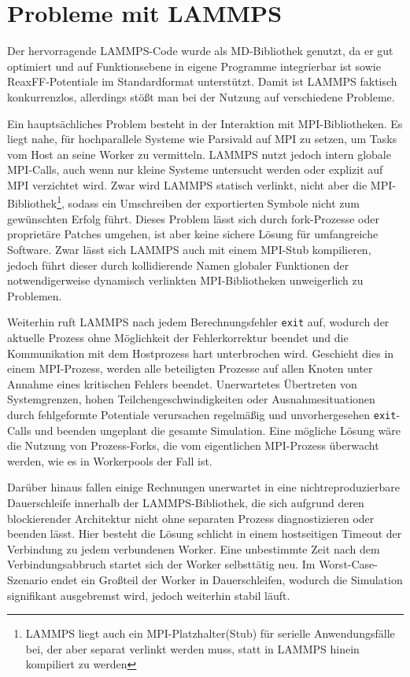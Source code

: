 \section{Probleme mit LAMMPS}
\label{lammpssucks}

Der hervorragende LAMMPS-Code wurde als MD-Bibliothek genutzt, da er gut optimiert und auf Funktionsebene in eigene Programme integrierbar ist sowie ReaxFF-Potentiale im Standardformat unterstützt.
Damit ist LAMMPS faktisch konkurrenzlos, allerdings stößt man bei der Nutzung auf verschiedene Probleme.

Ein hauptsächliches Problem besteht in der Interaktion mit MPI-Bibliotheken.
Es liegt nahe, für hochparallele Systeme wie Parsivald auf MPI zu setzen, um Tasks vom Host an seine Worker zu vermitteln.
LAMMPS nutzt jedoch intern globale MPI-Calls, auch wenn nur kleine Systeme untersucht werden oder explizit auf MPI verzichtet wird.
Zwar wird LAMMPS statisch verlinkt, nicht aber die MPI-Bibliothek\footnote{LAMMPS liegt auch ein MPI-Platzhalter(Stub) für serielle Anwendungsfälle bei, der aber separat verlinkt werden muss, statt in LAMMPS hinein kompiliert zu werden}, sodass ein Umschreiben der exportierten Symbole nicht zum gewünschten Erfolg führt.
Dieses Problem lässt sich durch fork-Prozesse oder proprietäre Patches umgehen, ist aber keine sichere Lösung für umfangreiche Software.
Zwar lässt sich LAMMPS auch mit einem MPI-Stub kompilieren, jedoch führt dieser durch kollidierende Namen globaler Funktionen der notwendigerweise dynamisch verlinkten MPI-Bibliotheken unweigerlich zu Problemen.

Weiterhin ruft LAMMPS nach jedem Berechnungsfehler \texttt{exit} auf, wodurch der aktuelle Prozess ohne Möglichkeit der Fehlerkorrektur beendet und die Kommunikation mit dem Hostprozess hart unterbrochen wird.
Geschieht dies in einem MPI-Prozess, werden alle beteiligten Prozesse auf allen Knoten unter Annahme eines kritischen Fehlers beendet.
Unerwartetes Übertreten von Systemgrenzen, hohen Teilchengeschwindigkeiten oder Ausnahmesituationen durch fehlgeformte Potentiale verursachen regelmäßig und unvorhergesehen \texttt{exit}-Calls und beenden ungeplant die gesamte Simulation.
Eine mögliche Lösung wäre die Nutzung von Prozess-Forks, die vom eigentlichen MPI-Prozess überwacht werden, wie es in Workerpools der Fall ist.

Darüber hinaus fallen einige Rechnungen unerwartet in eine nichtreproduzierbare Dauerschleife innerhalb der LAMMPS-Bibliothek, die sich aufgrund deren blockierender Architektur nicht ohne separaten Prozess diagnostizieren oder beenden lässt.
Hier besteht die Lösung schlicht in einem hostseitigen Timeout der Verbindung zu jedem verbundenen Worker.
Eine unbestimmte Zeit nach dem Verbindungsabbruch startet sich der Worker selbsttätig neu.
Im Worst-Case-Szenario endet ein Großteil der Worker in Dauerschleifen, wodurch die Simulation signifikant ausgebremst wird, jedoch weiterhin stabil läuft.


